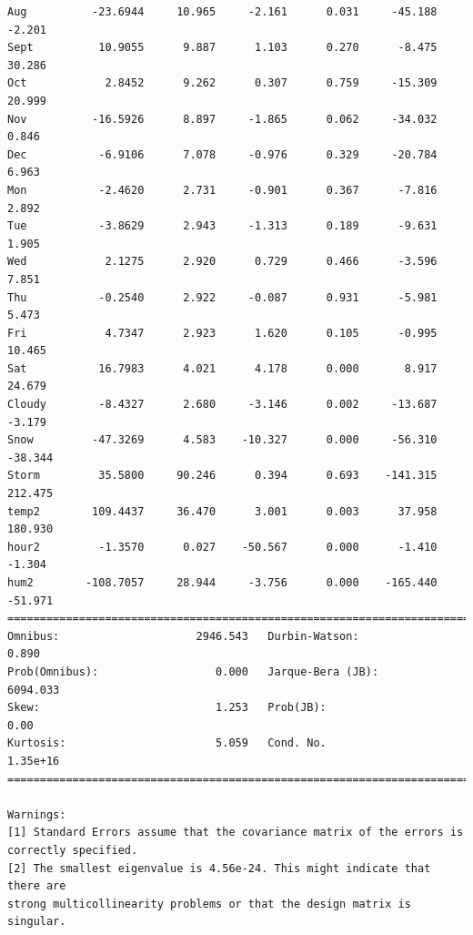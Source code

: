 \documentclass[11pt]{article}
\begin{document}
\begin{Verbatim}[commandchars=\\\{\}]
Aug          -23.6944     10.965     -2.161      0.031     -45.188      -2.201
Sept          10.9055      9.887      1.103      0.270      -8.475      30.286
Oct            2.8452      9.262      0.307      0.759     -15.309      20.999
Nov          -16.5926      8.897     -1.865      0.062     -34.032       0.846
Dec           -6.9106      7.078     -0.976      0.329     -20.784       6.963
Mon           -2.4620      2.731     -0.901      0.367      -7.816       2.892
Tue           -3.8629      2.943     -1.313      0.189      -9.631       1.905
Wed            2.1275      2.920      0.729      0.466      -3.596       7.851
Thu           -0.2540      2.922     -0.087      0.931      -5.981       5.473
Fri            4.7347      2.923      1.620      0.105      -0.995      10.465
Sat           16.7983      4.021      4.178      0.000       8.917      24.679
Cloudy        -8.4327      2.680     -3.146      0.002     -13.687      -3.179
Snow         -47.3269      4.583    -10.327      0.000     -56.310     -38.344
Storm         35.5800     90.246      0.394      0.693    -141.315     212.475
temp2        109.4437     36.470      3.001      0.003      37.958     180.930
hour2         -1.3570      0.027    -50.567      0.000      -1.410      -1.304
hum2        -108.7057     28.944     -3.756      0.000    -165.440     -51.971
==============================================================================
Omnibus:                     2946.543   Durbin-Watson:                   0.890
Prob(Omnibus):                  0.000   Jarque-Bera (JB):             6094.033
Skew:                           1.253   Prob(JB):                         0.00
Kurtosis:                       5.059   Cond. No.                     1.35e+16
==============================================================================

Warnings:
[1] Standard Errors assume that the covariance matrix of the errors is correctly specified.
[2] The smallest eigenvalue is 4.56e-24. This might indicate that there are
strong multicollinearity problems or that the design matrix is singular.

    \end{Verbatim}
\end{document}
